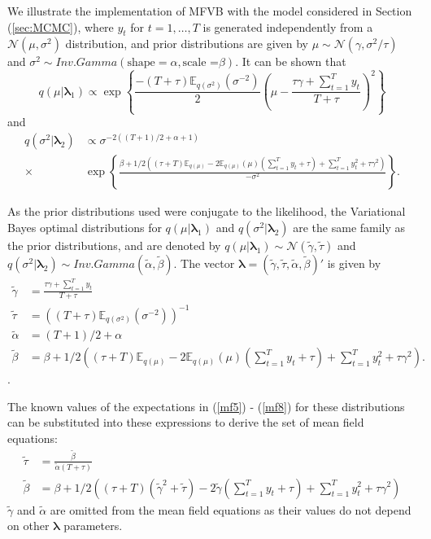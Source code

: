\documentclass[12pt,a4paper]{article}%
\numberwithin{equation}{section}
\begin{document}
We illustrate the implementation of MFVB with the model considered in Section (\ref{sec:MCMC}), where $y_t$ for $t = 1, \dots, T$ is generated independently from a $\mathcal{N}(\mu, \sigma^2)$ distribution, and prior distributions are given by $\mu \sim \mathcal{N}(\gamma, \sigma^2 / \tau)$ and $\sigma^2 \sim Inv.Gamma(\mbox{shape} = \alpha, \mbox{scale =}\beta)$. It can be shown that
\begin{equation}
\label{mf3}
q(\mu | \boldsymbol{\lambda}_1) \propto \exp \left\{ \frac{-(T + \tau) \mathbb{E}_{q(\sigma^2)}(\sigma^{-2})}{2} \left( \mu - \frac{\tau \gamma + \sum_{t=1}^{T} y_t}{T + \tau} \right)^2 \right\}
\end{equation}
and
\begin{align}
\label{mf4}
q(\sigma^2 | \boldsymbol{\lambda}_2) &\propto \sigma^{-2((T+1)/2 + \alpha + 1)} \nonumber \\
\times &\exp \left\{ \frac{ \beta + 1/2\left((\tau + T)\mathbb{E}_{q(\mu)} - 2 \mathbb{E}_{q(\mu)}(\mu)(\sum_{t=1}^{T}y_t + \tau) + \sum_{t=1}^{T} y_t^2 + \tau \gamma^2\right)}{-\sigma^2} \right\}.
\end{align}

As the prior distributions used were conjugate to the likelihood, the Variational Bayes optimal distributions for $q(\mu |  \boldsymbol{\lambda}_1)$ and $q(\sigma^2 | \boldsymbol{\lambda}_2)$ are the same family as the prior distributions, and are denoted by $q(\mu | \boldsymbol{\lambda}_1) \sim \mathcal{N}(\tilde{\gamma}, \tilde{\tau})$ and $q(\sigma^2 | \boldsymbol{\lambda}_2) \sim Inv.Gamma(\tilde{\alpha}, \tilde{\beta})$. The vector $\boldsymbol{\lambda} = (\tilde{\gamma}, \tilde{\tau}, \tilde{\alpha}, \tilde{\beta})'$ is given by
\begin{align}
\tilde{\gamma} &= \frac{\tau \gamma + \sum_{t=1}^{T} y_t}{T + \tau}  \label{mf5} \\ 
\tilde{\tau} &= \left((T + \tau)\mathbb{E}_{q(\sigma^2)}(\sigma^{-2})\right )^{-1} \label{mf6} \\
\tilde{\alpha} &= (T+1)/2 + \alpha  \label{mf7} \\
\tilde{\beta} &= \beta + 1/2\left((\tau + T)\mathbb{E}_{q(\mu)} - 2 \mathbb{E}_{q(\mu)}(\mu)(\sum_{t=1}^{T}y_t + \tau) + \sum_{t=1}^{T} y_t^2 + \tau \gamma^2 \right). \label{mf8}
\end{align}.

The known values of the expectations in (\ref{mf5}) - (\ref{mf8}) for these distributions can be substituted into these expressions to derive the set of mean field equations:
\begin{align}
\tilde{\tau} &= \frac{\tilde{\beta}}{\tilde{\alpha}(T + \tau)} \label{mf9} \\
\tilde{\beta} &= \beta + 1/2\left((\tau + T)(\tilde{\gamma}^2 + \tilde{\tau}) - 2 \tilde{\gamma}(\sum_{t=1}^{T}y_t + \tau) + \sum_{t=1}^{T} y_t^2 + \tau \gamma^2 \right)\label{mf10}
\end{align}
$\tilde{\gamma}$ and $\tilde{\alpha}$ are omitted from the mean field equations as their values do not depend on other $\boldsymbol{\lambda}$ parameters. 
\end{document}
